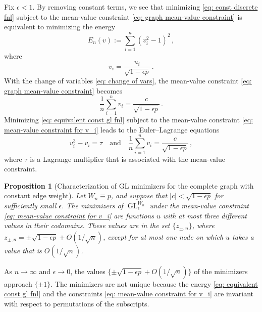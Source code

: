 \documentclass[11pt]{amsart}
\newtheorem{proposition}{Proposition}[section]
\def\ep{\epsilon}
\def\ra{\rightarrow}
\def\GL{\operatorname{GL}}
\numberwithin{equation}{section}
\begin{document}
{Fix $\ep < 1$. {By removing constant terms, we see that} minimizing \eqref{eq: const discrete fnl} subject to the {mean-value constraint} \eqref{eq: graph mean-value constraint} is equivalent to minimizing the energy
\begin{equation}\label{eq: equivalent const gl fnl}
   E_n(v):= \sum_{i=1}^n \left( v_i^2 - 1\right)^2 \,, 
\end{equation}
where 
\begin{equation}\label{eq: change of vars}
    v_i = \frac{u_i}{\sqrt{{1 - \ep p}}} \,.
\end{equation} 
With the change of variables \eqref{eq: change of vars}, the {mean-value constraint} \eqref{eq: graph mean-value constraint} becomes 
\begin{equation}\label{eq: mean-value constraint for v_i}
    \frac{1}{n} \sum_{i=1}^n v_i = \frac{c}{\sqrt{1 - \ep p}}\,. 
\end{equation}
Minimizing \eqref{eq: equivalent const gl fnl} subject to  the {mean-value constraint} \eqref{eq: mean-value constraint for v_i} leads to the Euler--Lagrange equations 
\begin{equation} \label{eq: const graph EL equation}
    v_i^3 - v_i = \tau \quad \text{and} \quad \frac{1}{n} \sum_{i  =1}^n v_i = \frac{c}{\sqrt{1 - \ep p}} \,, 
\end{equation}
where $\tau$ is a Lagrange multiplier that is associated with the {mean-value constraint}.



\begin{proposition}[Characterization of GL minimizers for the complete graph with constant edge weight]\label{prop: const gl minimizers}
Let $W_n \equiv p$, and suppose that $|c| < \sqrt{1 - \ep p}$ for sufficiently small $\ep$.
The minimizers of $\GL^{W_n}_\ep$ {under the {mean-value constraint} \eqref{eq: mean-value constraint for v_i}} are functions $u$ with %
at most three different values in their codomains. These values are in the set
$\{ z_{\pm, n}\}$, where  $z_{\pm, n} = \pm \sqrt{1 - \ep p} + O(1/\sqrt{n})$,
except for at most one node on which $u$ takes a value that is $O(1/\sqrt{n})$. 
\end{proposition}


As $n \ra \infty$ and $\ep \ra 0$, the values
$\{\pm \sqrt{1 - \ep p} + O(1/\sqrt{n})\}$ of the minimizers approach $\{\pm 1\}$. The minimizers are not unique because the energy \eqref{eq: equivalent const gl fnl} and the constraints \eqref{eq: mean-value constraint for v_i} are invariant with respect to permutations of the subscripts.

}
\end{document}
